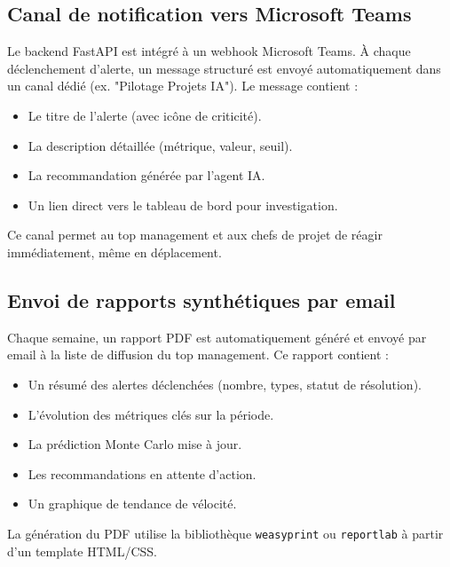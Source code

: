 \subsection{Canal de notification vers Microsoft Teams}
Le backend FastAPI est intégré à un webhook Microsoft Teams. À chaque déclenchement d’alerte, un message structuré est envoyé automatiquement dans un canal dédié (ex. "Pilotage Projets IA"). Le message contient :
\begin{itemize}
    \renewcommand{\labelitemi}{—}
    \item Le titre de l’alerte (avec icône de criticité).
    \item La description détaillée (métrique, valeur, seuil).
    \item La recommandation générée par l’agent IA.
    \item Un lien direct vers le tableau de bord pour investigation.
\end{itemize}
Ce canal permet au top management et aux chefs de projet de réagir immédiatement, même en déplacement.

\subsection{Envoi de rapports synthétiques par email}
Chaque semaine, un rapport PDF est automatiquement généré et envoyé par email à la liste de diffusion du top management. Ce rapport contient :
\begin{itemize}
    \renewcommand{\labelitemi}{—}
    \item Un résumé des alertes déclenchées (nombre, types, statut de résolution).
    \item L’évolution des métriques clés sur la période.
    \item La prédiction Monte Carlo mise à jour.
    \item Les recommandations en attente d’action.
    \item Un graphique de tendance de vélocité.
\end{itemize}
La génération du PDF utilise la bibliothèque \texttt{weasyprint} ou \texttt{reportlab} à partir d’un template HTML/CSS.

